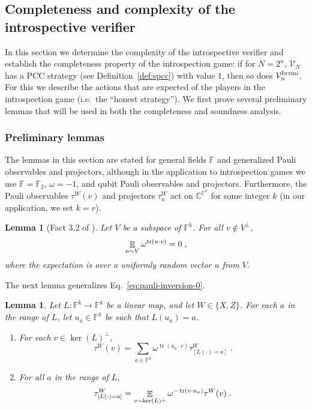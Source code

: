 \documentclass[11pt]{article}
\newtheorem{lemma}[theorem]{Lemma}
\theoremstyle{definition}
\newcommand{\C}{\ensuremath{\mathbb{C}}}
\newcommand{\F}{\ensuremath{\mathbb{F}}}
\DeclareMathOperator{\tr}{tr}
\newcommand{\E}{\mathop{\mathbb{E}}\displaylimits} %
\newcommand{\verifier}{\mathcal{V}}
\newcommand{\gamestyle}[1]{\ensuremath{\textsc{#1}}\xspace}
\newcommand{\intro}{\gamestyle{Intro}}
\begin{document}
\subsection{Completeness and complexity of the introspective verifier}

In this section we determine the complexity of the introspective verifier and
establish the completeness property of the introspection game: if for $N = 2^n$,
$\verifier_N$ has a PCC strategy (see Definition~\ref{def:spcc})  with value $1$,
then so does $\verifier^\intro_n$.
For this we describe the actions that are expected of the players in the
introspection game (i.e.\ the ``honest strategy'').
We first prove several preliminary lemmas that will be used in both the
completeness and soundness analysis.

\subsubsection{Preliminary lemmas}

The lemmas in this section are stated for general fields $\F$ and generalized
Pauli observables and projectors, although in the application to introspection
games we use $\F = \F_2$, $\omega = -1$, and qubit Pauli observables and
projectors.
Furthermore, the Pauli observables $\tau^W(v)$ and projectors $\tau^W_u$ act on
$\C^{\F^k}$ for some integer $k$ (in our application, we set $k=r$).

\begin{lemma}[Fact 3.2 of \cite{NW19}]
  \label{lem:cancellation}
  Let $V$ be a subspace of $\F^k$. For all $v \not\in V^\perp$, 
  \begin{equation*}
    \E_{u \sim V} \omega^{\tr(u \cdot v)} = 0\;,
  \end{equation*}
  where the expectation is over a uniformly random vector $u$ from $V$.
\end{lemma}


The next lemma generalizes Eq.~\eqref{eq:pauli-inversion-0}.

\begin{lemma}\label{lem:why-didnt-i-think-of-this-before}
Let $L: \F^k \to \F^k$ be a linear map, and let $W \in \{X, Z\}$.
For each $a$ in the range of $L$, let $u_a \in \F^k$ be such that $L(u_a) = a$. 
\begin{enumerate}
\item For each $v \in \ker(L)^\perp$, 
\begin{equation*}
\tau^W(v) = \sum_{a \in \F^k} \omega^{\tr(u_a \cdot v)} \tau^W_{[L(\cdot)=a]}\;.
\end{equation*}
\item For all $a$ in the range of $L$,
\begin{equation*}
\tau^W_{[L(\cdot)=a]} = \E_{v \sim \ker(L)^\perp} \omega^{-\tr(v \cdot u_a)} \tau^W(v)\;.
\end{equation*}
\end{enumerate}
\end{lemma}
\end{document}
